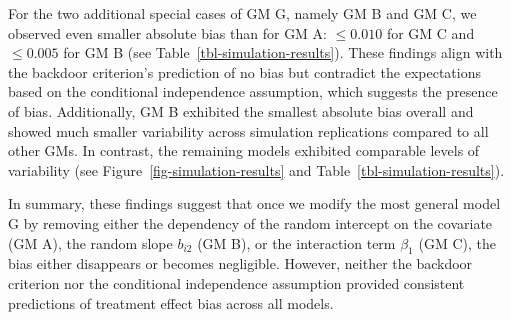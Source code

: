\documentclass[
  11pt,
  a4paper,
]{article}
\begin{document}
For the two additional special cases of GM G, namely GM B and GM C, we
observed even smaller absolute bias than for GM A: \(\leq 0.010\) for GM
C and \(\leq 0.005\) for GM B (see Table~\ref{tbl-simulation-results}).
These findings align with the backdoor criterion's prediction of no bias
but contradict the expectations based on the conditional independence
assumption, which suggests the presence of bias. Additionally, GM B
exhibited the smallest absolute bias overall and showed much smaller
variability across simulation replications compared to all other GMs. In
contrast, the remaining models exhibited comparable levels of
variability (see Figure~\ref{fig-simulation-results} and
Table~\ref{tbl-simulation-results}).

In summary, these findings suggest that once we modify the most general
model G by removing either the dependency of the random intercept on the
covariate (GM A), the random slope \(b_{i2}\) (GM B), or the interaction
term \(\beta_1\) (GM C), the bias either disappears or becomes
negligible. However, neither the backdoor criterion nor the conditional
independence assumption provided consistent predictions of treatment
effect bias across all models.
\end{document}
